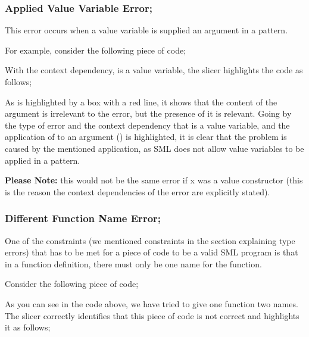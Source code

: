 \documentclass{report}
\begin{document}
\begin{itemize}
\subsubsection{Applied Value Variable Error;}

\subitem This error occurs when a value variable is supplied an
argument in a pattern.

For example, consider the following piece of code;


With the context dependency,  is a value variable,
 the slicer highlights the code as follows;


As  is highlighted by a box with a red line, it shows
that the content of the argument is irrelevant to the error, but the
presence of it is relevant. Going by the type of error and the context
dependency that  is a value variable, and the
application of  to an argument () is
highlighted, it is clear that the problem is caused by the mentioned
application, as SML does not allow value variables to be applied in a
pattern.

\textbf{Please Note:} this would not be the same error if x was a value
constructor (this is the reason the context dependencies of the error are
explicitly stated).


\vspace{0.5in}


\subsubsection{Different Function Name Error;}

  \subitem One of the constraints (we mentioned constraints in the
  section explaining type errors) that has to be met for a piece of
  code to be a valid SML program is that in a function definition,
  there must only be one name for the function.

Consider the following piece of code;


As you can see in the code above, we have tried to give one function
two names. The slicer correctly identifies that this piece of code is
not correct and highlights it as follows;


\end{itemize}
\end{document}
